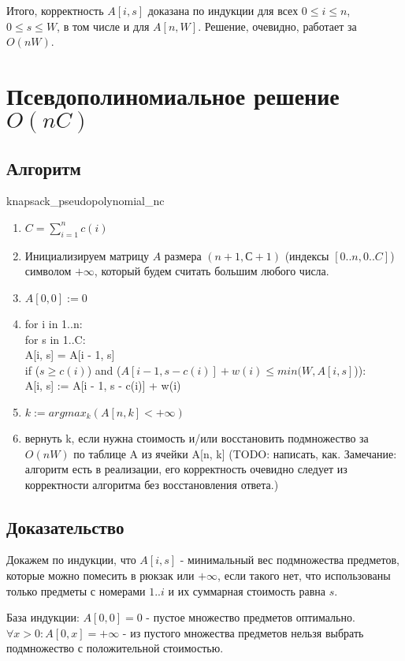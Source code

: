 \documentclass{article}
\begin{document}
	Итого, корректность $A[i, s]$ доказана по индукции для всех $ 0 \leq i \leq n$, $0 \leq s \leq W$, в том числе и для $A[n, W]$. Решение, очевидно, работает за $O(nW)$.


\section{Псевдополиномиальное решение $O(nC)$}
	\subsection{Алгоритм}
	
	knapsack\_pseudopolynomial\_nc
	\begin{enumerate}
		\item $C = \sum\limits_{i = 1}^{n} {c(i)}$
		\item Инициализируем матрицу $A$ размера $(n + 1, С + 1)$ (индексы $[0..n, 0..C]$) символом $+\infty$, который будем считать большим любого числа.
		\item $A[0, 0] := 0$
		\item for i in 1..n: \\
			for s in 1..C: \\
			A[i, s] = A[i - 1, s] \\
			if ($s \geq c(i)$) and ($A[i - 1, s - c(i)] + w(i) \leq min(W, A[i, s]$)): \\
				A[i, s] := A[i - 1, s - c(i)] + w(i)
		\item $k := argmax_{k}(A[n, k] < +\infty)$
		\item вернуть k, если нужна стоимость и/или восстановить подмножество за $O(nW)$ по таблице A из ячейки A[n, k] (TODO: написать, как. Замечание: алгоритм есть в реализации, его корректность очевидно следует из корректности алгоритма без восстановления ответа.)
			
	\end{enumerate}
	
	\subsection{Доказательство}
	
	Докажем по индукции, что $A[i, s]$ - минимальный вес подмножества предметов, которые можно помесить в рюкзак или $+\infty$, если такого нет, что использованы только предметы с номерами $1..i$ и их суммарная стоимость равна $s$.
	
	База индукции: $A[0, 0] = 0$ - пустое множество предметов оптимально.
	$\forall x > 0: A[0, x] = +\infty$ - из пустого множества предметов нельзя выбрать подмножество с положительной стоимостью.
	
\end{document}
